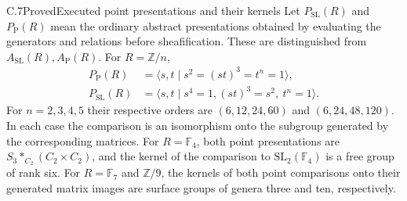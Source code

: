 \begin{statement}{C.7}{Proved}{Executed point presentations and their kernels}
Let $P_{\mathrm{SL}}(R)$ and $P_{\mathrm P}(R)$ mean the ordinary
abstract presentations obtained by evaluating the generators and
relations before sheafification. These are distinguished from
$A_{\mathrm{SL}}(R),A_{\mathrm P}(R)$. For $R=\mathbb Z/n$,
\[
 \begin{split}
 P_{\mathrm P}(R)&=\langle s,t\mid s^2=(st)^3=t^n=1\rangle,\\
 P_{\mathrm{SL}}(R)&=\langle s,t\mid s^4=1,
                         (st)^3=s^2,\ t^n=1\rangle.
 \end{split}
 \tag{C.9}
\]
For $n=2,3,4,5$ their respective orders are
$(6,12,24,60)$ and $(6,24,48,120)$. In each case the comparison
is an isomorphism onto the subgroup generated by the corresponding
matrices. For $R=\mathbb F_4$, both point presentations are
$S_3*_{C_2}(C_2\times C_2)$, and the kernel of the comparison
to $\mathrm{SL}_2(\mathbb F_4)$ is a free group of rank six.
For $R=\mathbb F_7$ and $\mathbb Z/9$, the kernels of both
point comparisons onto their generated matrix images are surface
groups of genera three and ten, respectively.
\end{statement}
